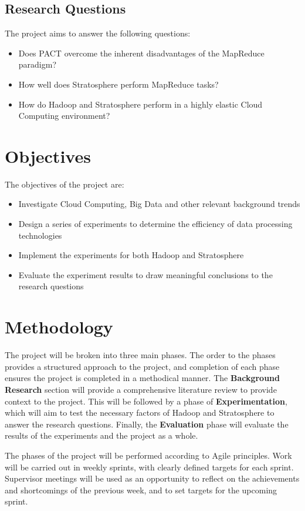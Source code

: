 \subsection{Research Questions}
The project aims to answer the following questions:

\begin{itemize}
	\item Does PACT overcome the inherent disadvantages of the MapReduce paradigm?
	\item How well does Stratosphere perform MapReduce tasks?
	\item How do Hadoop and Stratosphere perform in a highly elastic Cloud Computing environment?
\end{itemize}  

\section{Objectives}
The objectives of the project are:

\begin{itemize}
	\item Investigate Cloud Computing, Big Data and other relevant background trends
	\item Design a series of experiments to determine the efficiency of data processing technologies
	\item Implement the experiments for both Hadoop and Stratosphere
	\item Evaluate the experiment results to draw meaningful conclusions to the research questions
\end{itemize}

\section{Methodology}
The project will be broken into three main phases. The order to the phases provides a structured approach to the project, and completion of each phase ensures the project is completed in a methodical manner. The \textbf{Background Research} section will provide a comprehensive literature review to provide context to the project. This will be followed by a phase of \textbf{Experimentation}, which will aim to test the necessary factors of Hadoop and Stratosphere to answer the research questions. Finally, the \textbf{Evaluation} phase will evaluate the results of the experiments and the project as a whole.

The phases of the project will be performed according to Agile principles. Work will be carried out in weekly sprints, with clearly defined targets for each sprint. Supervisor meetings will be used as an opportunity to reflect on the achievements and shortcomings of the previous week, and to set targets for the upcoming sprint.

